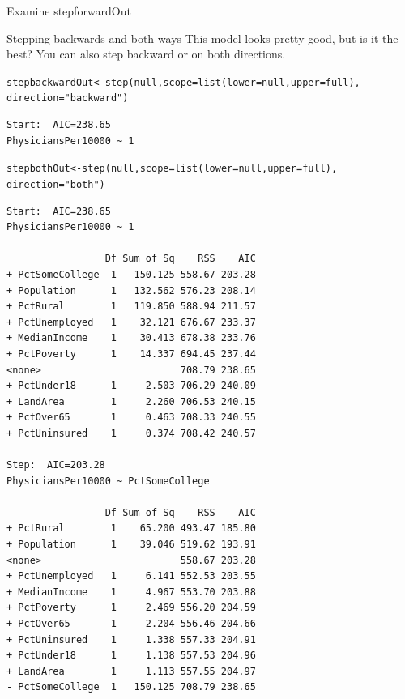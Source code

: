 \documentclass{beamer}\usepackage[]{graphicx}\usepackage[]{color}
\makeatletter
\newcommand{\hlstr}[1]{\textcolor[rgb]{1,0.894,0.71}{#1}}%
\newcommand{\hlstd}[1]{\textcolor[rgb]{1,0.894,0.769}{#1}}%
\newcommand{\hlkwb}[1]{\textcolor[rgb]{0.804,0.776,0.451}{#1}}%
\newcommand{\hlkwc}[1]{\textcolor[rgb]{0.78,0.941,0.545}{#1}}%
\newcommand{\hlkwd}[1]{\textcolor[rgb]{1,0.78,0.769}{#1}}%
\newenvironment{kframe}{%
 \def\at@end@of@kframe{}%
 \ifinner\ifhmode%
  \def\at@end@of@kframe{\end{minipage}}%
  \begin{minipage}{\columnwidth}%
 \fi\fi%
 \def\FrameCommand##1{\hskip\@totalleftmargin \hskip-\fboxsep
 \colorbox{shadecolor}{##1}\hskip-\fboxsep
     \hskip-\linewidth \hskip-\@totalleftmargin \hskip\columnwidth}%
 \MakeFramed {\advance\hsize-\width
   \@totalleftmargin\z@ \linewidth\hsize
   \@setminipage}}%
 {\par\unskip\endMakeFramed%
 \at@end@of@kframe}
\newenvironment{knitrout}{}{} %
\makeatother
\begin{document}
\begin{darkframes}
\begin{frame}[fragile]{Examine stepforwardOut}
     \lc %
    \end{frame}


    \begin{frame}[fragile]{Stepping backwards and both ways}
     This model looks pretty good, but is it the best?
     You can also step backward or on both directions.

    \fontsize{8}{8}\selectfont

\begin{knitrout}
\begin{kframe}
\begin{alltt}
\hlstd{stepbackwardOut} \hlkwb{<-} \hlkwd{step}\hlstd{(null,} \hlkwc{scope}\hlstd{=}\hlkwd{list}\hlstd{(}\hlkwc{lower}\hlstd{=null,} \hlkwc{upper}\hlstd{=full),}
                        \hlkwc{direction} \hlstd{=}\hlstr{"backward"}\hlstd{)}
\end{alltt}
\begin{verbatim}
Start:  AIC=238.65
PhysiciansPer10000 ~ 1
\end{verbatim}
\begin{alltt}
\hlstd{stepbothOut} \hlkwb{<-} \hlkwd{step}\hlstd{(null,} \hlkwc{scope}\hlstd{=}\hlkwd{list}\hlstd{(}\hlkwc{lower}\hlstd{=null,} \hlkwc{upper}\hlstd{=full),}
                    \hlkwc{direction} \hlstd{=}\hlstr{"both"}\hlstd{)}
\end{alltt}
\begin{verbatim}
Start:  AIC=238.65
PhysiciansPer10000 ~ 1

                 Df Sum of Sq    RSS    AIC
+ PctSomeCollege  1   150.125 558.67 203.28
+ Population      1   132.562 576.23 208.14
+ PctRural        1   119.850 588.94 211.57
+ PctUnemployed   1    32.121 676.67 233.37
+ MedianIncome    1    30.413 678.38 233.76
+ PctPoverty      1    14.337 694.45 237.44
<none>                        708.79 238.65
+ PctUnder18      1     2.503 706.29 240.09
+ LandArea        1     2.260 706.53 240.15
+ PctOver65       1     0.463 708.33 240.55
+ PctUninsured    1     0.374 708.42 240.57

Step:  AIC=203.28
PhysiciansPer10000 ~ PctSomeCollege

                 Df Sum of Sq    RSS    AIC
+ PctRural        1    65.200 493.47 185.80
+ Population      1    39.046 519.62 193.91
<none>                        558.67 203.28
+ PctUnemployed   1     6.141 552.53 203.55
+ MedianIncome    1     4.967 553.70 203.88
+ PctPoverty      1     2.469 556.20 204.59
+ PctOver65       1     2.204 556.46 204.66
+ PctUninsured    1     1.338 557.33 204.91
+ PctUnder18      1     1.138 557.53 204.96
+ LandArea        1     1.113 557.55 204.97
- PctSomeCollege  1   150.125 708.79 238.65


\end{verbatim}
\end{kframe}
\end{knitrout}
\end{frame}
\end{darkframes}
\end{document}
